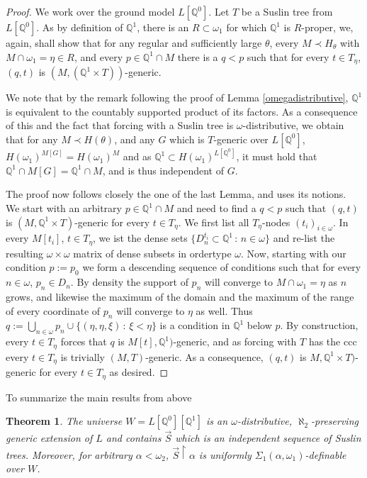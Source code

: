 \documentclass[a4paper,12pt]{article}
\newtheorem{theorem}{Theorem}[section]
\newcommand{\forceQ}{\mathbb{Q}}
\begin{document}
\begin{proof}
We work over the ground model $L[\forceQ^0]$. Let $T$ be a Suslin tree from $L[\forceQ^0]$. As by definition of $\forceQ^1$, there is an $R \subset \omega_1$ for which $\forceQ^1$ is $R$-proper, we, again, shall show that for any regular and sufficiently large
 $\theta$, every $M \prec H_{\theta}$ with $M \cap \omega_1 = \eta \in R$, and every
 $p \in \forceQ^1 \cap M$ there is a $q<p$ such that for every
 $t \in T_{\eta}$, $(q,t)$ is $(M,(\forceQ^1 \times T))$-generic.
 
We note that by the remark following the proof of Lemma \ref{omegadistributive}, $\forceQ^1$ is equivalent to the countably supported product of its factors. As a consequence of this and the fact that forcing with a Suslin tree is $\omega$-distributive, we obtain that for any $M \prec H(\theta)$,
and any $G$ which is $T$-generic over $L[\forceQ^0]$, $H(\omega_1)^{M[G]}= H(\omega_1)^M$ and as $\forceQ^1 \subset H(\omega_1)^{L[\forceQ^0]}$, it must hold that $\forceQ^1 \cap M[G] = \forceQ^1 \cap M$, and is thus independent of $G$.
 
The proof now follows closely the one of the last Lemma, and uses its notions. 
We start with an arbitrary $p \in \forceQ^1 \cap M$ and need to find a $q<p$ such that $(q,t)$ is $(M, \forceQ^1 \times T)$-generic for every $t \in T_{\eta}$.
We first list all $T_{\eta}$-nodes $(t_i)_{i \in \omega}$. In every $M[t_i]$, $t \in T_{\eta}$, we ist the dense sets $\{D^{t_i}_n \subset \forceQ^1 \, : \, n \in \omega\}$ and re-list the resulting $\omega \times \omega$ matrix of dense subsets in ordertype $\omega$. Now, starting with our condition $p:=p_0$ we form a descending sequence of conditions such that for every $n \in \omega$, $p_n \in D_n$. By density the support of $p_n$ will converge to $M \cap \omega_1=\eta$ as $n$ grows, and likewise the maximum of the domain and the maximum of the range of every coordinate of $p_n$ will converge to $\eta$ as well.
Thus $q:= \bigcup_{n \in \omega} p_n \cup \{ (\eta, \eta, \xi) \, : \, \xi < \eta \}$ is a condition in $\forceQ^1$ below $p$. By construction, every $t \in T_{\eta}$ forces that $q$ is $M[t],\forceQ^1)$-generic, and as forcing with $T$ has the ccc every $t \in T_{\eta}$ is trivially $(M,T)$-generic. As a consequence, $(q,t)$ is $M,\forceQ^1 \times T)$-generic for every $t\in T_{\eta}$ as desired.
\end{proof}
To summarize the main results from above
\begin{theorem}
The universe $W=L[\forceQ^0][\forceQ^1]$ is an $\omega$-distributive, $\aleph_2$-preserving generic extension of $L$ and contains $\vec{S}$ which is an independent sequence of Suslin trees. Moreover, for arbitrary $\alpha < \omega_2$, $\vec{S} \upharpoonright \alpha$ is uniformly $\Sigma_1(\alpha,\omega_1)$-definable over $W$.
\end{theorem}
\end{document}
